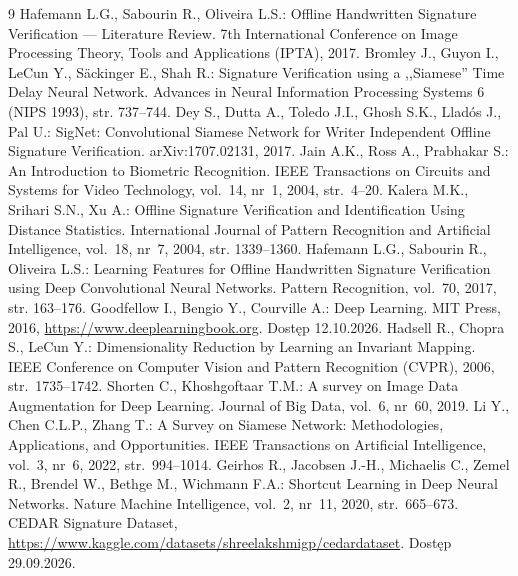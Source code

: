 \documentclass[12pt, twoside, openright]{article}
\begin{document}
\clearpage
{}

\begin{thebibliography}{9}
 Hafemann L.G., Sabourin R., Oliveira L.S.: Offline Handwritten Signature Verification --- Literature Review. 7th International Conference on Image Processing Theory, Tools and Applications (IPTA), 2017.
 Bromley J., Guyon I., LeCun Y., Säckinger E., Shah R.: Signature Verification using a ,,Siamese'' Time Delay Neural Network. Advances in Neural Information Processing Systems 6 (NIPS 1993), str. 737--744.
 Dey S., Dutta A., Toledo J.I., Ghosh S.K., Lladós J., Pal U.: SigNet: Convolutional Siamese Network for Writer Independent Offline Signature Verification. arXiv:1707.02131, 2017.
 Jain A.K., Ross A., Prabhakar S.: An Introduction to Biometric Recognition. IEEE Transactions on Circuits and Systems for Video Technology, vol.~14, nr~1, 2004, str.~4--20.
 Kalera M.K., Srihari S.N., Xu A.: Offline Signature Verification and Identification Using Distance Statistics. International Journal of Pattern Recognition and Artificial Intelligence, vol.~18, nr~7, 2004, str. 1339--1360.
 Hafemann L.G., Sabourin R., Oliveira L.S.: Learning Features for Offline Handwritten Signature Verification using Deep Convolutional Neural Networks. Pattern Recognition, vol.~70, 2017, str. 163--176.
 Goodfellow I., Bengio Y., Courville A.: Deep Learning. MIT Press, 2016, \url{https://www.deeplearningbook.org}. Dostęp 12.10.2026.
 Hadsell R., Chopra S., LeCun Y.: Dimensionality Reduction by Learning an Invariant Mapping. IEEE Conference on Computer Vision and Pattern Recognition (CVPR), 2006, str.~1735--1742.
 Shorten C., Khoshgoftaar T.M.: A survey on Image Data Augmentation for Deep Learning. Journal of Big Data, vol.~6, nr~60, 2019.
 Li Y., Chen C.L.P., Zhang T.: A Survey on Siamese Network: Methodologies, Applications, and Opportunities. IEEE Transactions on Artificial Intelligence, vol.~3, nr~6, 2022, str.~994--1014.
 Geirhos R., Jacobsen J.-H., Michaelis C., Zemel R., Brendel W., Bethge M., Wichmann F.A.: Shortcut Learning in Deep Neural Networks. Nature Machine Intelligence, vol.~2, nr~11, 2020, str.~665--673.
 CEDAR Signature Dataset, \url{https://www.kaggle.com/datasets/shreelakshmigp/cedardataset}. Dostęp 29.09.2026.

\end{thebibliography}
\end{document}
